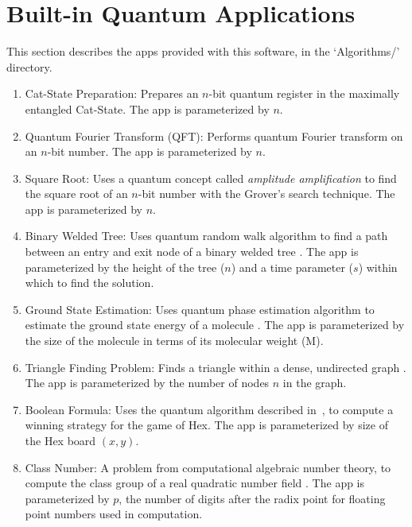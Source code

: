 \chapter{Built-in Quantum Applications}\label{ch:apps}

This section describes the apps provided with this software, in the `Algorithms/' directory.

\begin{enumerate}

\item Cat-State Preparation: Prepares an $n$-bit quantum register in the maximally entangled Cat-State. 
  The app is parameterized by $n$.

\item Quantum Fourier Transform (QFT): Performs quantum Fourier transform on an $n$-bit
  number. The app is parameterized by $n$.

\item Square Root: Uses a quantum concept
  called \emph{amplitude amplification} to find the square root of an $n$-bit number
  with the Grover's search technique\cite{Grover}. The app is parameterized by $n$.

\item Binary Welded Tree: Uses quantum random walk algorithm to
  find a path between an entry and exit node of a binary welded tree
  \cite{ref:bwt}. The app is parameterized by the height of the tree ($n$) and
  a time parameter ($s$) within which to find the solution.

\item Ground State Estimation: Uses quantum phase estimation algorithm to
  estimate the ground state energy of a molecule \cite{ref:gse}. The app
  is parameterized by the size of the molecule in terms of its molecular
  weight (M).

\item Triangle Finding Problem: Finds a triangle within a dense,
  undirected graph \cite{ref:tfp}. The app is parameterized by the
  number of nodes $n$ in the graph.

\item Boolean Formula: Uses the quantum algorithm described
  in~\cite{ref:boolean_formula}, to compute a winning strategy for the game of
  Hex. The app is parameterized by size of the Hex board $(x,y)$.

\item Class Number: A problem from computational algebraic number theory,
  to compute the class group of a real quadratic number field
  \cite{DBLP:conf/stoc/Hallgren05}. The app is parameterized by $p$, the
  number of digits after the radix point for floating point numbers used in
  computation.


\end{enumerate}
